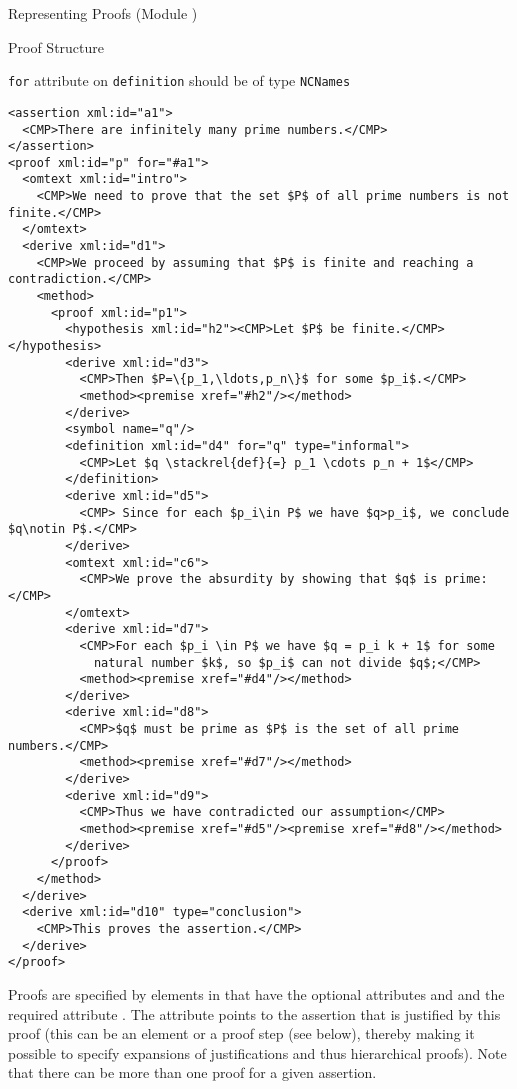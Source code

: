\begin{tchapter}[id=proofs,short=Representing Proofs]{Representing Proofs (Module {})}
\begin{tsection}[id=proof-text]{Proof Structure}
\begin{erratum}[reported-by=Michael Kohlhase,date=2009-08-11]{{\texttt{for}} attribute on
    {\texttt{definition}} should be of type {\texttt{NCNames}}}
\begin{lstlisting}[label=lst:primes-omdoc-text,mathescape,
  caption={An {\omdoc} Representation of {\myfigref{pf-example1-math}}.},
  index={symbol,definition}]
<assertion xml:id="a1">
  <CMP>There are infinitely many prime numbers.</CMP>
</assertion>
<proof xml:id="p" for="#a1">
  <omtext xml:id="intro">
    <CMP>We need to prove that the set $P$ of all prime numbers is not finite.</CMP>
  </omtext>
  <derive xml:id="d1">
    <CMP>We proceed by assuming that $P$ is finite and reaching a contradiction.</CMP>
    <method>
      <proof xml:id="p1">
        <hypothesis xml:id="h2"><CMP>Let $P$ be finite.</CMP></hypothesis>
        <derive xml:id="d3">
          <CMP>Then $P=\{p_1,\ldots,p_n\}$ for some $p_i$.</CMP>
          <method><premise xref="#h2"/></method>
        </derive>
        <symbol name="q"/>
        <definition xml:id="d4" for="q" type="informal">
          <CMP>Let $q \stackrel{def}{=} p_1 \cdots p_n + 1$</CMP>
        </definition>
        <derive xml:id="d5">
          <CMP> Since for each $p_i\in P$ we have $q>p_i$, we conclude $q\notin P$.</CMP>
        </derive>  
        <omtext xml:id="c6">
          <CMP>We prove the absurdity by showing that $q$ is prime:</CMP>
        </omtext>  
        <derive xml:id="d7">
          <CMP>For each $p_i \in P$ we have $q = p_i k + 1$ for some
            natural number $k$, so $p_i$ can not divide $q$;</CMP>
          <method><premise xref="#d4"/></method>
        </derive>
        <derive xml:id="d8">
          <CMP>$q$ must be prime as $P$ is the set of all prime numbers.</CMP> 
          <method><premise xref="#d7"/></method>
        </derive>
        <derive xml:id="d9">
          <CMP>Thus we have contradicted our assumption</CMP>
          <method><premise xref="#d5"/><premise xref="#d8"/></method>
        </derive>  
      </proof>
    </method>
  </derive>  
  <derive xml:id="d10" type="conclusion">
    <CMP>This proves the assertion.</CMP>
  </derive>  
</proof>
\end{lstlisting}
\end{erratum}
Proofs are specified by {} elements in {\omdoc} that have the optional
attributes {} and {} and the
required attribute {}. The {} attribute points
to the assertion that is justified by this proof (this can be an {}
element or a {} proof step (see below), thereby making it possible to
specify expansions of justifications and thus hierarchical proofs). Note that there can be
more than one proof for a given assertion.


\end{tsection}
\end{tchapter}
